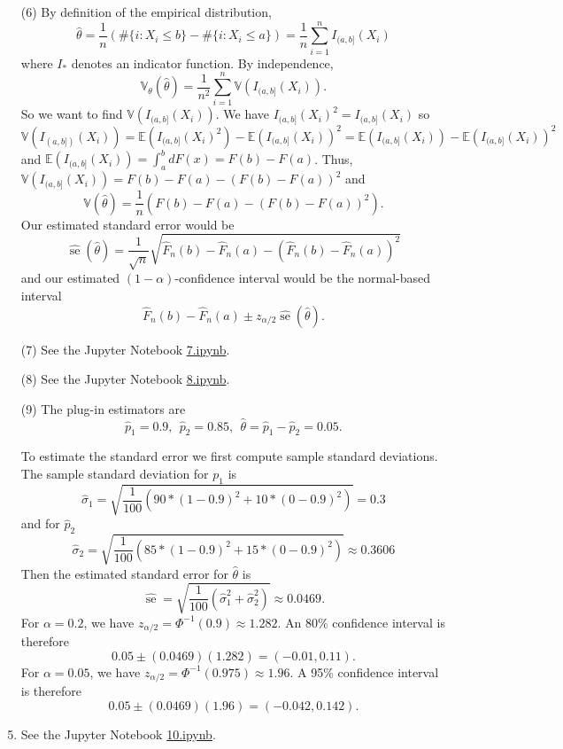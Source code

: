 \documentclass[10pt]{article}
\newcommand{\V}{\mathbb{V}}
\newcommand{\E}{\mathbb{E}}
\newcommand{\se}{\operatorname{se}}
\begin{document}
\begin{enumerate}
\item[(6)]
By definition of the empirical distribution,
\[
\hat \theta = \frac{1}{n} (\#\{i : X_i \leq b\} - \#\{i : X_i \leq a\})
=\frac{1}{n} \sum_{i=1}^n I_{(a,b]}(X_i)
\]
where $I_*$ denotes an indicator function. By independence,
\[
\V_\theta(\hat \theta) = \frac{1}{n^2} \sum_{i=1}^n \V(I_{(a,b]}(X_i)).
\]
So we want to find $\V(I_{(a,b]}(X_i))$. We have $I_{(a,b]}(X_i)^2=I_{(a,b]}(X_i)$
so
\[
\V(I_{(a,b])}(X_i)) = \E(I_{(a,b]}(X_i)^2) - \E(I_{(a,b]}(X_i))^2
= \E(I_{(a,b]}(X_i)) - \E(I_{(a,b]}(X_i))^2
\]
and $\E(I_{(a,b]}(X_i))=\int_a^b dF(x)=F(b)-F(a)$. Thus,
$\V(I_{(a,b]}(X_i))=F(b)-F(a) - (F(b)-F(a))^2$ and
\[
\V(\hat \theta) = \frac{1}{n}\left(F(b)-F(a) - \left(F(b)-F(a)\right)^2\right).
\]
Our estimated standard error would be
\[
\widehat{\se}(\hat \theta) = \frac{1}{\sqrt{n}}\sqrt{\hat F_n(b) - \hat F_n(a) -
(\hat F_n(b) - \hat F_n(a))^2}
\]
and our estimated $(1-\alpha)$-confidence interval would be the normal-based
interval
\[
\hat F_n(b) - \hat F_n(a) \pm z_{\alpha/2}\widehat{\se}(\hat \theta).
\]

\item[(7)]
See the Jupyter Notebook
\href{https://github.com/ajrasmus/some_of_statistics/blob/main/chapter_7/7.ipynb}{7.ipynb}.

\item[(8)]
See the Jupyter Notebook
\href{https://github.com/ajrasmus/some_of_statistics/blob/main/chapter_7/8.ipynb}{8.ipynb}.

\item[(9)]
The plug-in estimators are
\[
\hat p_1 = 0.9, \ \ \hat p_2 = 0.85,  \ \ \hat \theta = \hat p_1-\hat p_2 = 0.05.
\]

To estimate the standard error we first compute sample standard deviations.
The sample standard deviation for $p_1$ is
\[
\hat \sigma_1 = \sqrt{\frac{1}{100} (90 * (1 - 0.9)^2 + 10 * (0 - 0.9)^2)} = 0.3
\]
and for $\hat p_2$
\[
\hat \sigma_2 = \sqrt{\frac{1}{100} (85 * (1 - 0.9)^2 + 15 * (0 - 0.9)^2)} \approx
0.3606
\]
Then the estimated standard error for $\hat \theta$ is
\[
\widehat{\se} = \sqrt{\frac{1}{100}\left(\hat \sigma_1^2 + \hat \sigma_2^2\right)}
\approx 0.0469.
\]
For $\alpha=0.2$, we have $z_{\alpha/2}=\Phi^{-1}(0.9) \approx 1.282$. An 80\%
confidence interval is therefore
\[
0.05 \pm (0.0469)(1.282) = (-0.01, 0.11).
\]
For $\alpha=0.05$, we have $z_{\alpha/2}=\Phi^{-1}(0.975) \approx 1.96$. A 95\%
confidence interval is therefore
\[
0.05 \pm (0.0469)(1.96) = (-0.042, 0.142).
\]

\item
See the Jupyter Notebook
\href{https://github.com/ajrasmus/some_of_statistics/blob/main/chapter_7/10.ipynb}{10.ipynb}.

\end{enumerate}
\end{document}
